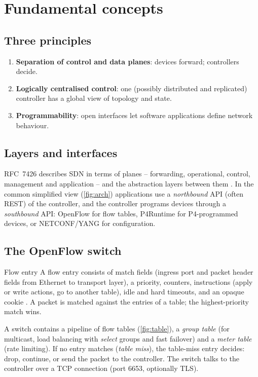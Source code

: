 \documentclass[11pt,a4paper]{article}
\begin{document}
\section{Fundamental concepts}

\subsection{Three principles}
\begin{enumerate}
  \item \textbf{Separation of control and data planes}: devices forward; controllers decide.
  \item \textbf{Logically centralised control}: one (possibly distributed and replicated) controller
        has a global view of topology and state.
  \item \textbf{Programmability}: open interfaces let software applications define network behaviour.
\end{enumerate}

\subsection{Layers and interfaces}
RFC~7426 describes SDN in terms of planes -- forwarding, operational, control, management and application --
and the abstraction layers between them \cite{rfc7426}. In the common simplified view
(\cref{fig:arch}) applications use a \emph{northbound} API (often REST) of the controller, and the controller
programs devices through a \emph{southbound} API: OpenFlow \cite{onf2015openflow} for flow tables, P4Runtime
for P4-programmed devices, or NETCONF/YANG for configuration.

\begin{acnfigure}
  \caption{SDN layers: applications, controller and data plane with northbound and southbound APIs.}
  \label{fig:arch}
\end{acnfigure}

\subsection{The OpenFlow switch}
\begin{definitionbox}{Flow entry}
A flow entry consists of match fields (ingress port and packet header fields from Ethernet to transport
layer), a priority, counters, instructions (apply or write actions, go to another table), idle and hard
timeouts, and an opaque cookie \cite{onf2015openflow}. A packet is matched against the entries of a table;
the highest-priority match wins.
\end{definitionbox}
A switch contains a pipeline of flow tables (\cref{fig:table}), a \emph{group table} (for multicast,
load balancing with \emph{select} groups and fast failover) and a \emph{meter table} (rate limiting). If no
entry matches (\emph{table miss}), the table-miss entry decides: drop, continue, or send the packet to the
controller. The switch talks to the controller over a TCP connection (port 6653, optionally TLS).
\end{document}
